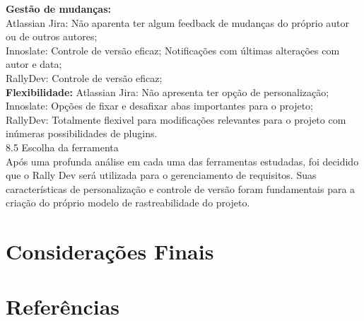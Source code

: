 {\textbf{Gestão de mudanças:}\\
	\tab Atlassian Jira: Não aparenta ter algum feedback de mudanças do próprio autor ou de outros autores;\\
	\tab Innoslate: Controle de versão eficaz; Notificações com últimas alterações com autor e data;\\
	\tab RallyDev: Controle de versão eficaz;\\

\textbf{Flexibilidade:}
	\tab Atlassian Jira: Não apresenta ter opção de personalização;\\
	\tab Innoslate: Opções de fixar e desafixar abas importantes para o projeto;\\
	\tab RallyDev: Totalmente flexivel para modificações relevantes para o projeto com inúmeras possibilidades de plugins.\\

{\large{8.5 Escolha da ferramenta}}\\

\tab Após uma profunda análise em cada uma das ferramentas estudadas, foi decidido que o Rally Dev será utilizada para o gerenciamento de requisitos. Suas características de personalização e controle de versão foram fundamentais para a criação do próprio modelo de rastreabilidade do projeto.  \\


\section{Considerações Finais}
\label{sec:nova_sess_o}

\section{Referências}
\label{sec:nova_sess_o}




\onecolumn
\begin{usecase}



\end{usecase}
\onecolumn

}
